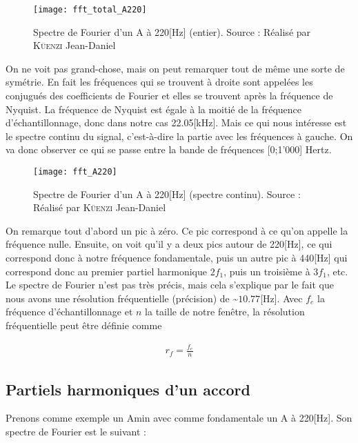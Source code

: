 \begin{figure}[H]
	\centering
	\texttt{[image: fft\_total\_A220]}
	\caption[Spectre de Fourier d'un A à 220 Hertz (entier)]{Spectre de Fourier d'un A à 220[Hz] (entier). Source : Réalisé par \textsc{Küenzi} Jean-Daniel}
	\label{fig:fft_total_a220}
\end{figure}

On ne voit pas grand-chose, mais on peut remarquer tout de même une sorte de symétrie. En fait les fréquences qui se trouvent à droite sont appelées les conjugués des coefficients de Fourier et elles se trouvent après la fréquence de Nyquist. La fréquence de Nyquist est égale à la moitié de la fréquence d'échantillonnage, donc dans notre cas 22.05[kHz]. Mais ce qui nous intéresse est le spectre continu du signal, c'est-à-dire la partie avec les fréquences à gauche. On va donc observer ce qui se passe entre la bande de fréquences [0;1'000] Hertz.

\begin{figure}[H]
	\centering
	\texttt{[image: fft\_A220]}
	\caption[Spectre de Fourier d'un A à 220 Hertz (spectre continu)]{Spectre de Fourier d'un A à 220[Hz] (spectre continu). Source : Réalisé par \textsc{Küenzi} Jean-Daniel}
	\label{fig:fft_a220}
\end{figure}

On remarque tout d'abord un pic à zéro. Ce pic correspond à ce qu'on appelle la fréquence nulle. Ensuite, on voit qu’il y a deux pics autour de 220[Hz], ce qui correspond donc à notre fréquence fondamentale, puis un autre pic à 440[Hz] qui correspond donc au premier partiel harmonique $2f_{1}$, puis un troisième à $3f_{1}$, etc. Le spectre de Fourier n'est pas très précis, mais cela s'explique par le fait que nous avons une résolution fréquentielle (précision) de \textasciitilde$10.77$[Hz]. Avec $f_{e}$ la fréquence d'échantillonnage et $n$ la taille de notre fenêtre, la résolution fréquentielle peut être définie comme

{\Large
	\setlength{\abovedisplayskip}{-0.5cm}
	\begin{align*}
		r_f = \frac{f_e}{n}
	\end{align*}
}

\subsection{Partiels harmoniques d'un accord}

Prenons comme exemple un Amin avec comme fondamentale un A à 220[Hz]. Son spectre de Fourier est le suivant :

